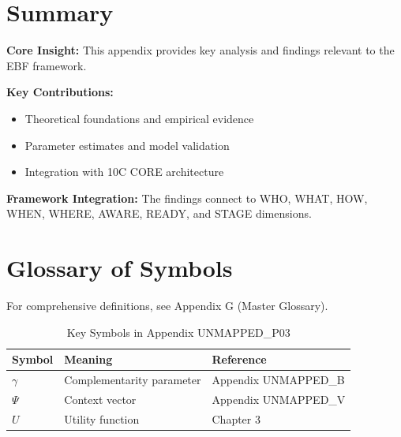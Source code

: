 \section{Summary}
\label{sec:p03-summary}

\begin{tcolorbox}[colback=gray!5!white, colframe=gray!75!black,
    title=Appendix UNMAPPED_P03 Summary]

\textbf{Core Insight:}
This appendix provides key analysis and findings relevant to the EBF framework.

\textbf{Key Contributions:}
\begin{itemize}[nosep]
    \item Theoretical foundations and empirical evidence
    \item Parameter estimates and model validation
    \item Integration with 10C CORE architecture
\end{itemize}

\textbf{Framework Integration:}
The findings connect to WHO, WHAT, HOW, WHEN, WHERE, AWARE, READY, and STAGE dimensions.

\end{tcolorbox}

\section{Glossary of Symbols}
\label{sec:p03-glossary}

For comprehensive definitions, see Appendix G (Master Glossary).

\begin{table}[htbp]
\centering
\caption{Key Symbols in Appendix UNMAPPED_P03}
\begin{tabular}{lll}
\toprule
\textbf{Symbol} & \textbf{Meaning} & \textbf{Reference} \\
\midrule
$\gamma$ & Complementarity parameter & Appendix UNMAPPED_B \\
$\Psi$ & Context vector & Appendix UNMAPPED_V \\
$U$ & Utility function & Chapter 3 \\
\bottomrule
\end{tabular}
\end{table}



